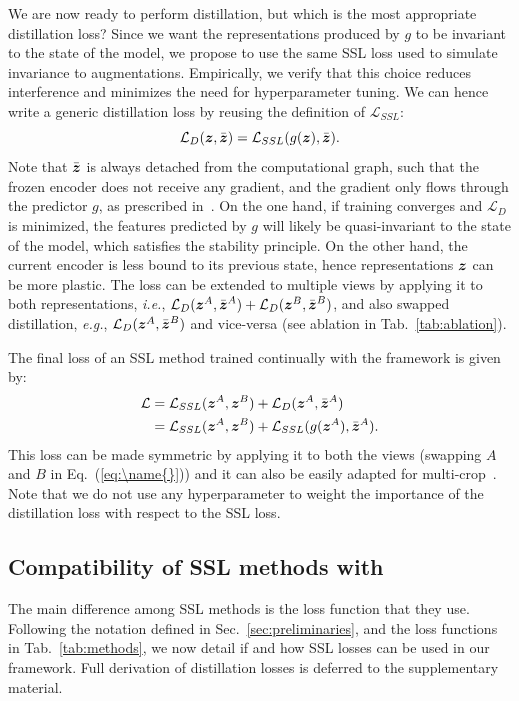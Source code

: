 We are now ready to perform distillation, but which is the most appropriate distillation loss? 
Since we want the representations produced by $g$ to be invariant to the state of the model, we propose to use the same SSL loss used to simulate invariance to augmentations. Empirically, we verify that this choice reduces interference and minimizes the need for hyperparameter tuning. We can hence write a generic distillation loss by reusing the definition of $\mathcal{L}_{SSL}$:
\begin{equation}
    \mathcal{L}_D(\boldsymbol{z}, \bar{\boldsymbol{z}}) = \mathcal{L}_{SSL} (g(\boldsymbol{z}), \bar{\boldsymbol{z}}).
\end{equation}
Note that $\bar{\boldsymbol{z}}$ is always detached from the computational graph, such that the frozen encoder does not receive any gradient, and the gradient only flows through the predictor $g$, as prescribed in~\cite{chen2021exploring}. On the one hand, if training  converges and $\mathcal{L}_D$ is minimized, the features predicted by $g$ will likely be quasi-invariant to the state of the model, which satisfies the stability principle. On the other hand, the current encoder is less bound to its previous state, hence representations $\boldsymbol{z}$ can be more plastic. The loss can be extended to multiple views by applying it to both representations, \textit{i.e.}, $\mathcal{L}_D(\boldsymbol{z}^A, \bar{\boldsymbol{z}}^A) + \mathcal{L}_D(\boldsymbol{z}^B, \bar{\boldsymbol{z}}^B)$, and also swapped distillation, \textit{e.g.}, $\mathcal{L}_D(\boldsymbol{z}^A, \bar{\boldsymbol{z}}^B)$ and vice-versa (see ablation in Tab.~\ref{tab:ablation}).

The final loss of an SSL method trained continually with the \name{} framework is given by:
\begin{equation}
\begin{aligned}
    \mathcal{L} &= \mathcal{L}_{SSL}(\zvect^A, \zvect^B) + \mathcal{L}_{D}(\zvect^A, \bar{\zvect}^A) \\
    &= \mathcal{L}_{SSL}(\zvect^A, \zvect^B)  +\mathcal{L}_{SSL} (g(\zvect^A), \bar{\zvect}^A).
\end{aligned}
\label{eq:\name{}}
\end{equation}
This loss can be made symmetric by applying it to both the views (swapping $A$ and $B$ in Eq.~(\ref{eq:\name{}})) and it can also be easily adapted for multi-crop~\cite{caron2020unsupervised}. Note that we do not use any hyperparameter to weight the importance of the distillation loss with respect to the SSL loss.


\vspace{-5pt}
\subsection{Compatibility of SSL methods with \name{}}
\label{sec:compatibility}
\vspace{-5pt}
The main difference among SSL methods is the loss function that they use. Following the notation defined in Sec.~\ref{sec:preliminaries}, and the loss functions in Tab.~\ref{tab:methods}, we now detail if and how SSL losses can be used in our \name{} framework. Full derivation of distillation losses is deferred to the supplementary material.

